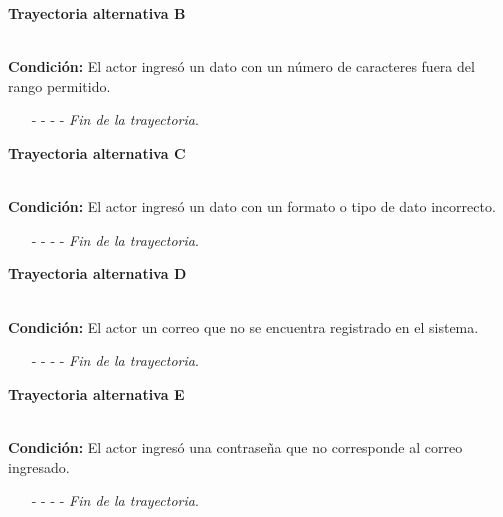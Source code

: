 		\hypertarget{CU1:TAB}{\textbf{Trayectoria alternativa B}}\\
		\noindent \textbf{Condición:} El actor ingresó un dato con un número de caracteres fuera del rango permitido.
		\begin{enumerate}
	\UCpaso[\UCsist] Muestra el  señalando el campo que presenta el error en la pantalla .
	\UCpaso[\UCactor] Regresa al paso \ref{P3} de la Trayectoria Principal.
	\item[- -] - - {\em {Fin de la trayectoria}}.
\end{enumerate}
		\hypertarget{CU1:TAC}{\textbf{Trayectoria alternativa C}}\\
		\noindent \textbf{Condición:} El actor ingresó un dato con un formato o tipo de dato incorrecto.
	\begin{enumerate}
		\UCpaso[\UCsist] Muestra el mensaje  señalando el campo que presenta el error en la pantalla .
		\UCpaso Regresa al paso \ref{P3} de la trayectoria principal.
		\item[- -] - - {\em {Fin de la trayectoria}}.
	\end{enumerate}

		\hypertarget{CU1:TAD}{\textbf{Trayectoria alternativa D}}\\
		\noindent \textbf{Condición:} El actor un correo que no se encuentra registrado en el sistema.
		\begin{enumerate}
	\UCpaso[\UCsist] Muestra el mensaje  en la pantalla  notificando que los datos ingresados son incorrectos.
	\UCpaso[\UCactor] Regresa al paso \ref{P3} de la Trayectoria Principal.
	\item[- -] - - {\em {Fin de la trayectoria}}.
\end{enumerate}

\hypertarget{CU1:TAE}{\textbf{Trayectoria alternativa E}}\\
\noindent \textbf{Condición:} El actor ingresó una contraseña que no corresponde al correo ingresado.
\begin{enumerate}
	\UCpaso[\UCsist] Muestra el mensaje  en la pantalla  notificando que los datos ingresados son incorrectos.
	\UCpaso[\UCactor] Regresa al paso \ref{P3} de la Trayectoria Principal.
	\item[- -] - - {\em {Fin de la trayectoria}}.
\end{enumerate}
